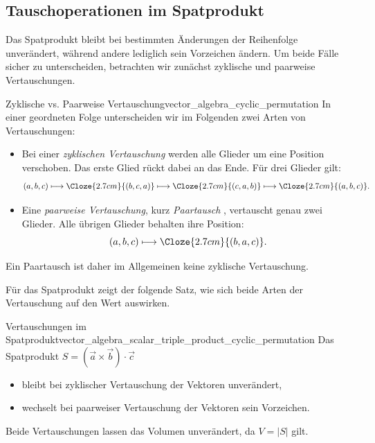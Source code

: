 \subsection{Tauschoperationen im Spatprodukt}
\label{subsec:vector_algebra_scalar_triple_product_properties}

Das Spatprodukt bleibt bei bestimmten Änderungen der Reihenfolge unverändert,
während andere lediglich sein Vorzeichen ändern. Um beide Fälle sicher zu
unterscheiden, betrachten wir zunächst zyklische und paarweise Vertauschungen.

\begin{DefinitionBox}{Zyklische vs. Paarweise Vertauschung}{vector_algebra_cyclic_permutation}
  In einer geordneten Folge unterscheiden wir im Folgenden zwei Arten von
  Vertauschungen:
  \begin{itemize}[leftmargin=1.6em,itemsep=0.5em,topsep=0.3em]
    \item Bei einer \emph{zyklischen Vertauschung}
       werden alle Glieder um eine Position
      verschoben. Das erste Glied rückt dabei an das Ende. Für drei Glieder gilt:
      \[
        (a,b,c)
        \longmapsto\Cloze{2.7cm}{(b,c,a)}
        \longmapsto\Cloze{2.7cm}{(c,a,b)}
        \longmapsto\Cloze{2.7cm}{(a,b,c)}.
      \]
    \item Eine \emph{paarweise Vertauschung}, kurz \emph{Paartausch}
      , vertauscht genau zwei Glieder. Alle übrigen
      Glieder behalten ihre Position:
      \[
        (a,b,c)\longmapsto\Cloze{2.7cm}{(b,a,c)}.
      \]
  \end{itemize}
  Ein Paartausch ist daher im Allgemeinen keine zyklische Vertauschung.
\end{DefinitionBox}


Für das Spatprodukt zeigt der folgende Satz, wie sich beide Arten der
Vertauschung auf den Wert auswirken.
\begin{TheoremBox}{Vertauschungen im Spatprodukt}{vector_algebra_scalar_triple_product_cyclic_permutation}
  Das Spatprodukt $S=(\vec a\times\vec b)\cdot\vec c$
  \smallskip
  \begin{itemize}[leftmargin=1.6em,itemsep=0.2em,topsep=0pt]
    \item bleibt bei \textcolor{THMBlue}{zyklischer Vertauschung} der Vektoren
      unverändert,
    \item wechselt bei \textcolor{olive!80!black}{paarweiser Vertauschung} der
      Vektoren sein Vorzeichen.
  \end{itemize}
  \begin{center}
  \end{center}
  Beide Vertauschungen lassen das Volumen unverändert, da $V=|S|$ gilt.
\end{TheoremBox}

